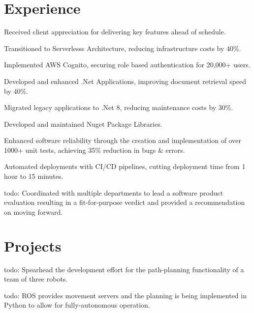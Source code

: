 \documentclass[]{deedy-resume-reversed}
\begin{document}
\begin{minipage}[t]{0.60\textwidth}


\section{Experience}
\vspace{\topsep} %
\begin{tightemize}
\item Received client appreciation for delivering key features ahead of schedule.
\item Transitioned to Serverlesss Architecture, reducing infrastructure costs by 40\%.
\item Implemented AWS Cognito, securing role based authentication for 20,000+ users.
\item Developed and enhanced .Net Applications, improving document retrieval speed by 40\%.
\item Migrated legacy applications to .Net 8, reducing maintenance costs by 30\%.
\item Developed and maintained Nuget Package Libraries.
\item Enhanced software reliability through the creation and implementation of over 1000+ unit tests, achieving 35\% reduction in bugs \& errors.
\item Automated deployments with CI/CD pipelines, cutting deployment time from 1 hour to 15 minutes.

\end{tightemize}
\sectionsep

\begin{tightemize}
\item todo: Coordinated with multiple departments to lead a software product evaluation resulting in a fit-for-purpose verdict and provided a recommendation on moving forward.
\end{tightemize}
\sectionsep


\section{Projects}
\begin{tightemize}
\item todo: Spearhead the development effort for the path-planning functionality of a team of three robots.
\item todo: ROS provides movement servers and the planning is being implemented in Python to allow for fully-autonomous operation.
\end{tightemize}
\sectionsep


\end{minipage}
\end{document}
